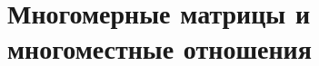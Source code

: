 \documentclass{article}
\begin{document}
 
\tableofcontents
\section{Многомерные матрицы и многоместные отношения}
\end{document}
